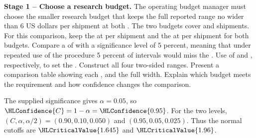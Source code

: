 \textbf{Stage 1 -- Choose a research budget.} The operating budget manager must choose the smaller research budget that keeps the full reported range no wider than 6 US dollars per shipment at both . The two budgets cover  and  shipments. For this comparison, keep the   at  per shipment and the   at  per shipment for both budgets. Compare a  of  with a significance level of 5 percent, meaning that under repeated use of the procedure 5 percent of intervals would miss the . Use  of  and , respectively, to set the   . Construct all four two-sided ranges. Present a comparison table showing each ,  and the full width. Explain which budget meets the requirement and how confidence changes the comparison.
\par\endgroup

\begingroup
\setlength{\abovedisplayskip}{6pt}
\setlength{\belowdisplayskip}{6pt}
\setlength{\abovedisplayshortskip}{3pt}
\setlength{\belowdisplayshortskip}{4pt}
\setlength{\parskip}{4pt}

The supplied significance gives $\alpha=0.05$, so $\HLConfidence{C}=1-\alpha=\HLConfidence{0.95}$. For the two levels, $(C,\alpha,\alpha/2)=(0.90,0.10,0.050)$ and $(0.95,0.05,0.025)$. Thus the normal cutoffs are $\HLCriticalValue{1.645}$ and $\HLCriticalValue{1.96}$.

